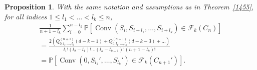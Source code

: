 \documentclass[12pt, reqno]{amsart}
\theoremstyle{plain}
\newtheorem{proposition}[theorem]{Proposition}
\theoremstyle{definition}
\theoremstyle{remark}
\begin{document}
\begin{proposition}\label{1139}
With the same notation and assumptions as in Theorem~\ref{1455}, for all indices $1\leq l_1 < \ldots < l_k \leq n$,
\begin{multline}\label{1921}
\frac 1 {n+1-l_k} \sum_{i=0}^{n-l_k} {\mathbb{P}}[{\mathop{\mathrm{Conv}}\nolimits}(S_{i}, S_{i+l_1},\ldots, S_{i+l_{k}})\in {\mathcal{F}}_k(C_n)]\\
=
\frac{
2(Q_{0, l_1,\ldots,l_{k}}^{(n+1)}(d-k-1) + Q_{0,l_1,\ldots,l_{k}}^{(n+1)}(d-k-3)+\ldots)
}{l_1! (l_2-l_1)!\ldots  (l_{k}-l_{k-1})! (n+1-l_{k})!}\\
={\mathbb{P}}[{\mathop{\mathrm{Conv}}\nolimits}(0, S_{l_1}',\ldots, S_{l_{k}}')\in {\mathcal{F}}_k(C_{n+1}')].
\end{multline}
\end{proposition}
\end{document}
